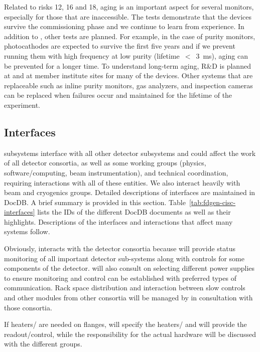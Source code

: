 Related to risks 12, 16 and 18, aging is an important aspect for several monitors, especially for those that are inaccessible. The  tests demonstrate that the devices survive the commissioning phase and we continue to learn from  experience. In addition to , other tests are planned. For example, in the case of purity monitors, photocathodes are expected to survive the first five years and if we prevent running them with high frequency at low purity (lifetime~$<$~\SI{3}{\milli\second}), aging can be prevented for a longer time. To understand long-term aging, R\&D is planned at  and at member institute sites for many of the devices. Other systems that are replaceable such as inline purity monitors, gas analyzers, and inspection cameras can be replaced when failures occur and maintained for the lifetime of the experiment.




\subsection{Interfaces}  
\label{sec:interfaces}

 subsystems interface with all other detector subsystems and could affect the work of all detector consortia, as well as some
working groups (physics, software/computing, beam instrumentation), and technical coordination, requiring interactions with all of these entities.  We also interact heavily with  beam and cryogenics groups.  
Detailed descriptions of  interfaces are maintained in  DocDB. A brief summary is provided in this section. Table~\ref{tab:fdgen-cisc-interfaces} lists the IDs of the different DocDB documents as well as their highlights. Descriptions of the interfaces and interactions that affect many systems follow. 

Obviously,  interacts with the detector consortia because  will provide status monitoring of all important detector sub-systems along with controls for some components of the detector.
 will also consult on selecting different power supplies to ensure monitoring and control can be established with preferred types of communication. 
Rack space distribution and interaction between slow controls and other modules from other consortia will be managed by  in consultation with those consortia. 

If heaters/ are needed on flanges,  will specify the heaters/ and will provide the readout/control, while the responsibility for the actual hardware will be discussed with the different groups.  

